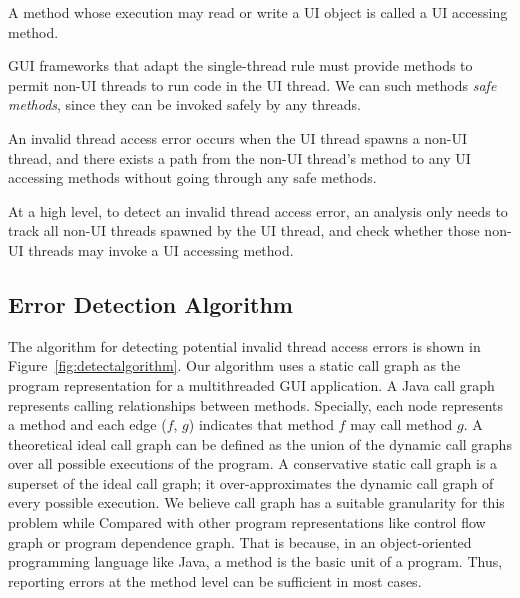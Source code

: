  { A method
whose execution may read or write a UI object is called a UI accessing method.}\vspace{1mm}

 {GUI frameworks that
adapt the single-thread rule must provide methods to permit non-UI threads
to run code in the UI thread. We can such methods \textit{safe methods}, since
they can be invoked safely by any threads.}\vspace{1mm}

 {An invalid
thread access error occurs when the UI thread spawns a non-UI thread, and there
exists a path from the non-UI thread's  method to any UI accessing methods
without going through any safe methods. }\vspace{2mm}

At a high level, to detect an invalid thread access error, an analysis only needs to track all
non-UI threads spawned by the UI thread, and check whether those non-UI threads
may invoke a UI accessing method.

\subsection{Error Detection Algorithm}

The algorithm for detecting potential invalid thread access errors
is shown in Figure~\ref{fig:detectalgorithm}. Our algorithm uses a
static call graph as the program representation for a multithreaded
GUI application. A Java call graph represents calling relationships
between methods. Specially, each node represents a method and each
edge ($f$, $g$) indicates that method $f$ may call method $g$.
A theoretical ideal call graph can be defined as the union of the
dynamic call graphs over all possible executions of the program. 
A conservative static call graph is a superset of the ideal call graph;
it over-approximates the
dynamic call graph of every possible execution. 
We believe call graph has a suitable granularity for this problem while
Compared with other
program representations like control flow graph or program dependence
graph. That is because, in an object-oriented programming language like
Java, a method is the basic unit of a program. Thus, reporting errors
at the method level can be sufficient in most cases.


